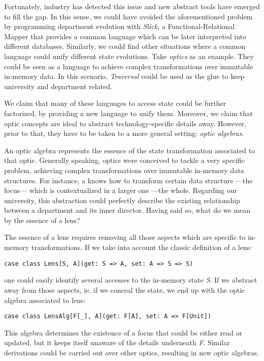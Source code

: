 \documentclass[a4paper]{article}
\begin{document}
Fortunately, industry has detected this issue and new abstract tools have
emerged to fill the gap. In this sense, we could have avoided the aforementioned
problem by programming department evolution with \emph{Slick}, a
Functional-Relational Mapper that provides a common language which can be later
interpreted into different databases. Similarly, we could find other situations
where a common language could unify different state evolutions. Take
\emph{optics} as an example. They could be seen as a language to achieve complex
transformations over immutable in-memory data. In this scenario,
\emph{Traversal} could be used as the glue to keep university and department
related.

We claim that many of these languages to access state could be further
factorized, by providing a new language to unify them. Moreover, we claim that
optic concepts are ideal to abstract technology-specific details away. However,
prior to that, they have to be taken to a more general setting: \emph{optic
algebras}.


An optic algebra represents the essence of the state transformation associated
to that optic. Generally speaking, optics were conceived to tackle a very
specific problem, achieving complex transformations over immutable in-memory
data structures. For instance, a  knows how to transform certain
data structure ---the focus--- which is contextualized in a larger one ---the
whole. Regarding our university, this abstraction could perfectly describe the
existing relationship between a department and its inner director. Having said
so, what do we mean by the essence of a lens?

The essence of a lens requires removing all those aspects which are specific to
in-memory transformations. If we take into account the classic definition of a
lens:

\begin{lstlisting}
case class Lens[S, A](get: S => A, set: A => S => S)
\end{lstlisting}
one could easily identify several accesses to the in-memory state \emph{S}. If
we abstract away from those aspects, ie. if we conceal the state, we end up with
the optic algebra associated to lens:
\begin{lstlisting}
case class LensAlg[F[_], A](get: F[A], set: A => F[Unit])
\end{lstlisting}
This algebra determines the existence of a focus that could be either read or
updated, but it keeps itself unaware of the details underneath \emph{F}. Similar
derivations could be carried out over other optics, resulting in new optic
algebras.
\end{document}
